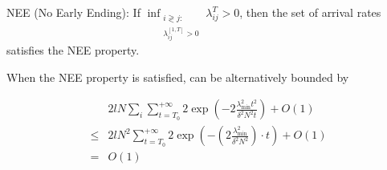 NEE (No Early Ending): If $\inf _{\substack{i \gtrless j: \\ \lambda_{i j}^{[1, T]}>0}} \lambda_{i j}^T>0$, then the set of arrival rates satisfies the NEE property.

When the NEE property is satisfied, can be alternatively bounded by

$$
\begin{aligned}
& 2 l N \sum_{i} \sum_{t=T_0}^{+\infty} 2 \exp \left(-2 \frac{\lambda_{\min}^2 t^2}{\delta^2 N^2 t}\right) + O(1) \\
\leqslant & 2 l N^2 \sum_{t=T_0}^{+\infty} 2 \exp \left(-\left(2 \frac{\lambda_{\min}^2}{\delta^2 N^2}\right) \cdot t\right)+O(1) \\
= & O(1)
\end{aligned}
$$

\newpage
